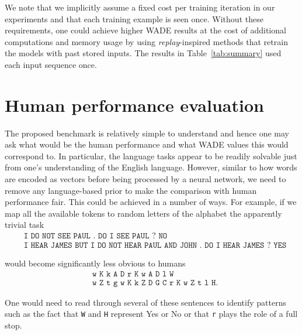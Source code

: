 We note that we implicitly assume a fixed cost per training iteration in our
experiments and that each training example is seen once. Without these
requirements, one could achieve higher WADE results at the cost of additional
computations and memory usage by using \emph{replay}-inspired methods
\parencite{hintonUsingFastWeights1987, robinsCatastrophicForgettingNeural1993a,
  gepperthBioInspiredIncrementalLearning2016,
  rebuffiIcarlIncrementalClassifier2017} that retrain the models with past
stored inputs. The results in Table~\ref{tab:summary} used each input sequence
once.

\section{Human performance evaluation}
\label{sec:human}
The proposed benchmark is relatively simple to understand and hence one may ask what would be the human performance and what WADE values this would correspond to. In
particular, the language tasks appear to be readily solvable just from one's
understanding of the English language. However, similar to how words are encoded
as vectors before being processed by a neural network, we need to remove any
language-based prior to make the comparison with human performance fair. This
could be achieved in a number of ways. For example, if we map all the available
tokens to random letters of the alphabet the apparently trivial task
{\small \begin{align*}
          & \texttt{I DO NOT SEE PAUL . DO I SEE PAUL ? NO} \\
          & \texttt{I HEAR JAMES BUT I DO NOT HEAR PAUL AND JOHN . DO I HEAR JAMES ? YES}
\end{align*}}

would become significantly less obvious to humans
{\small
\begin{align*}
  & \texttt{w K k A D r K w A D l W} \\
  & \texttt{w Z t g w K k Z D G C r K w Z t l H}.
\end{align*}
}

One would need to read through several of these sentences to identify patterns
such as the fact that \texttt{W} and \texttt{H} represent Yes or No or that
\texttt{r} plays the role of a full stop.


